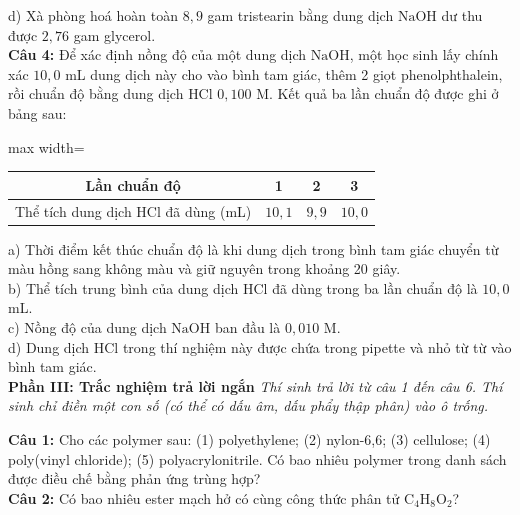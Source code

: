 \documentclass[12pt,a4paper]{article}
\begin{document}
\noindent d) Xà phòng hoá hoàn toàn $8{,}9$ gam tristearin bằng dung dịch $\text{NaOH}$ dư thu được $2{,}76$ gam glycerol.\\

\noindent \textbf{Câu 4:} Để xác định nồng độ của một dung dịch $\text{NaOH}$, một học sinh lấy chính xác $10{,}0$ mL dung dịch này cho vào bình tam giác, thêm 2 giọt phenolphthalein, rồi chuẩn độ bằng dung dịch $\text{HCl}$ $0{,}100$ M. Kết quả ba lần chuẩn độ được ghi ở bảng sau:\\
\begin{center}
\begin{adjustbox}{max width=\linewidth}
\begin{tabular}{|c|c|c|c|}
\hline
Lần chuẩn độ & 1 & 2 & 3 \\
\hline
Thể tích dung dịch $\text{HCl}$ đã dùng (mL) & $10{,}1$ & $9{,}9$ & $10{,}0$ \\
\hline
\end{tabular}
\end{adjustbox}
\end{center}
\noindent a) Thời điểm kết thúc chuẩn độ là khi dung dịch trong bình tam giác chuyển từ màu hồng sang không màu và giữ nguyên trong khoảng 20 giây.\\

\noindent b) Thể tích trung bình của dung dịch $\text{HCl}$ đã dùng trong ba lần chuẩn độ là $10{,}0$ mL.\\

\noindent c) Nồng độ của dung dịch $\text{NaOH}$ ban đầu là $0{,}010$ M.\\

\noindent d) Dung dịch $\text{HCl}$ trong thí nghiệm này được chứa trong pipette và nhỏ từ từ vào bình tam giác.\\

\vspace{0.5cm}
\textbf{Phần III: Trắc nghiệm trả lời ngắn} \textit{Thí sinh trả lời từ câu 1 đến câu 6. Thí sinh chỉ điền một con số (có thể có dấu âm, dấu phẩy thập phân) vào ô trống.}

\noindent \textbf{Câu 1:} Cho các polymer sau: (1) polyethylene; (2) nylon-6,6; (3) cellulose; (4) poly(vinyl chloride); (5) polyacrylonitrile. Có bao nhiêu polymer trong danh sách được điều chế bằng phản ứng trùng hợp?\\

\noindent \textbf{Câu 2:} Có bao nhiêu ester mạch hở có cùng công thức phân tử $\text{C}_4\text{H}_8\text{O}_2$?\\
\end{document}
